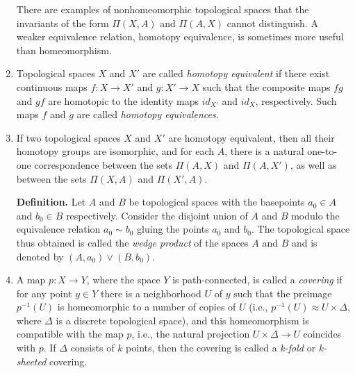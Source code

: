 \documentclass{ctexart}
\begin{document}
\begin{enumerate}
\qquad There are examples of nonhomeomorphic topological spaces that the invariants of the form $\Pi(X,A)$ and $\Pi(A,X)$ cannot distinguish. A weaker equivalence relation, homotopy equivalence, is sometimes more useful than homeomorphism.

\item Topological spaces $X$ and $X'$ are called \textit{homotopy
    equivalent} if there exist continuous maps $f : X \to X'$ and $g :
  X' \to X$ such that the composite maps $fg$ and $gf$ are homotopic
  to the identity maps $id_{X'}$ and $id_X$, respectively. Such maps $f$
  and $g$ are called \textit{homotopy equivalences}.

\item If two topological spaces $X$ and $X'$ are homotopy equivalent,
  then all their homotopy groups are isomorphic, and for each $A$,
  there is a natural one-to-one correspondence between the sets
  $\Pi(A,X)$ and $\Pi(A,X')$, as well as between the sets $\Pi(X,A)$
  and $\Pi(X',A)$.

\textbf{Definition.} Let $A$ and $B$ be topological spaces with the basepoints $a_0 \in A$ and $b_0 \in B$ respectively. Consider the disjoint union of $A$ and $B$ modulo the equivalence relation $a_0 \sim b_0$ gluing the points $a_0$ and $b_0$. The topological space thus obtained is called the \textit{wedge product} of the spaces $A$ and $B$ and is denoted by $(A,a_0) \vee (B,b_0)$.

\item A map $p : X \to Y$, where the space $Y$ is path-connected, is
  called a \textit{covering} if for any point $y \in Y$ there is a
  neighborhood $U$ of $y$ such that the preimage $p^{-1}(U)$ is
  homeomorphic to a number of copies of $U$ (i.e., $p^{-1}(U) \approx
  U \times \Delta$, where $\Delta$ is a discrete topological space),
  and this homeomorphism is compatible with the map $p$, i.e., the
  natural projection $U \times \Delta \to U$ coincides with $p$. If $\Delta$
  consists of $k$ points, then the covering is called a
  \textit{k-fold} or \textit{k-sheeted} covering.


\end{enumerate}
\end{document}
